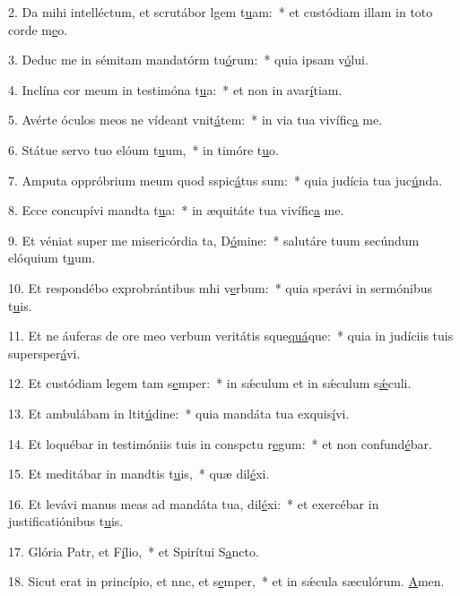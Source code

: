2. Da mihi intelléctum, et scrutábor lgem t\uline{u}am:~* et custódiam illam in toto corde m\uline{e}o.\par 
3. Deduc me in sémitam mandatórm tu\uline{ó}rum:~* quia ipsam v\uline{ó}lui.\par 
4. Inclína cor meum in testimóna t\uline{u}a:~* et non in avar\uline{í}tiam.\par 
5. Avérte óculos meos ne vídeant vnit\uline{á}tem:~* in via tua vivífic\uline{a} me.\par 
6. Státue servo tuo elóum t\uline{u}um,~* in timóre t\uline{u}o.\par 
7. Amputa oppróbrium meum quod sspic\uline{á}tus sum:~* quia judícia tua juc\uline{ú}nda.\par 
8. Ecce concupívi mandta t\uline{u}a:~* in æquitáte tua vivífic\uline{a} me.\par 
9. Et véniat super me misericórdia ta, D\uline{ó}mine:~* salutáre tuum secúndum elóquium t\uline{u}um.\par 
10. Et respondébo exprobrántibus mhi v\uline{e}rbum:~* quia sperávi in sermónibus t\uline{u}is.\par 
11. Et ne áuferas de ore meo verbum veritátis sque\uline{quá}que:~* quia in judíciis tuis supersper\uline{á}vi.\par 
12. Et custódiam legem tam s\uline{e}mper:~* in sǽculum et in sǽculum s\uline{ǽ}culi.\par 
13. Et ambulábam in ltit\uline{ú}dine:~* quia mandáta tua exquis\uline{í}vi.\par 
14. Et loquébar in testimóniis tuis in conspctu r\uline{e}gum:~* et non confund\uline{é}bar.\par 
15. Et meditábar in mandtis t\uline{u}is,~* quæ dil\uline{é}xi.\par 
16. Et levávi manus meas ad mandáta tua,  dil\uline{é}xi:~* et exercébar in justificatiónibus t\uline{u}is.\par 
17. Glória Patr, et F\uline{í}lio,~* et Spirítui S\uline{a}ncto.\par 
18. Sicut erat in princípio, et nnc, et s\uline{e}mper,~* et in sǽcula sæculórum. \uline{A}men.\par 
